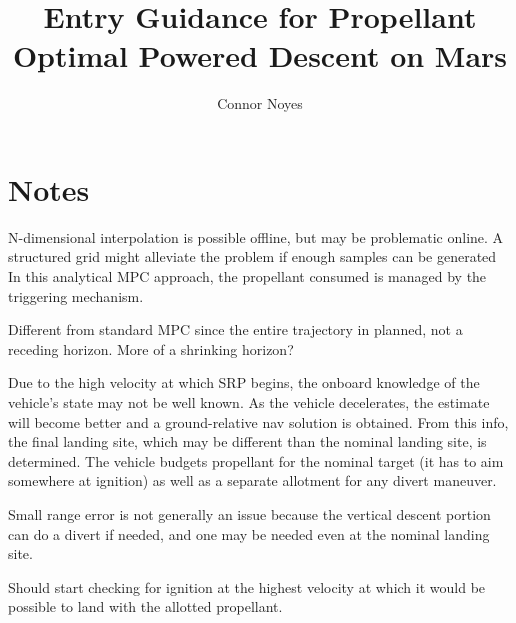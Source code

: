 \documentclass[]{article}
\title{Entry Guidance for Propellant Optimal Powered Descent on Mars}
\author{Connor Noyes}
\begin{document}
\maketitle

\section{Notes}
 N-dimensional interpolation is possible offline, but may be problematic online. A structured grid might alleviate the problem if enough samples can be generated 
In this analytical MPC approach, the propellant consumed is managed by the triggering mechanism. 

Different from standard MPC since the entire trajectory in planned, not a receding horizon. More of a shrinking horizon?

Due to the high velocity at which SRP begins, the onboard knowledge of the vehicle's state may not be well known. As the vehicle decelerates, the estimate will become better and a ground-relative nav solution is obtained. From this info, the final landing site, which may be different than the nominal landing site, is determined. The vehicle budgets propellant for the nominal target (it has to aim somewhere at ignition) as well as a separate allotment for any divert maneuver.



Small range error is not generally an issue because the vertical descent portion can do a divert if needed, and one may be needed even at the nominal landing site. 

Should start checking for ignition at the highest velocity at which it would be possible to land with the allotted propellant. 

\end{document}
